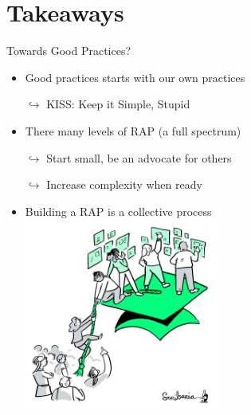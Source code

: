 \documentclass[xcolor=x11names,compress, aspectratio=169]{beamer}
\renewcommand{\(}{\begin{columns}}
\renewcommand{\)}{\end{columns}}
\newcommand{\<}[1]{\begin{column}{#1}}
\renewcommand{\>}{\end{column}}
\begin{document}
\section{Takeaways}

\begin{frame}{Towards Good Practices?  }
\pause
\begin{itemize}[<+->]
    \item Good practices starts with our own practices
    \item[$\hookrightarrow$]  KISS: Keep it Simple, Stupid
    \item There many levels of RAP (a full spectrum)
    \item[$\hookrightarrow$] Start small, be an advocate for others
    \item[$\hookrightarrow$] Increase complexity when ready
    \item Building a RAP is a collective process \\
        \includegraphics[width=0.5\textwidth]{DecolonisingKnowledge.jpg}
\end{itemize}
\end{frame}
\end{document}
